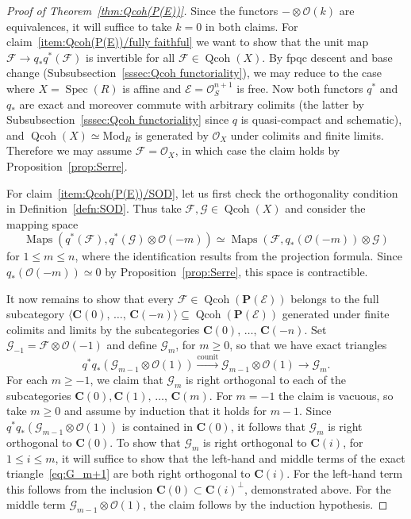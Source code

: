 \documentclass[11pt]{article}
\theoremstyle{definition}
\numberwithin{equation}{section}
\numberwithin{figure}{section}
\numberwithin{table}{section}
\newcommand{\sE}{\ensuremath{\mathcal{E}}\xspace}
\newcommand{\sF}{\ensuremath{\mathcal{F}}\xspace}
\newcommand{\sG}{\ensuremath{\mathcal{G}}\xspace}
\newcommand{\sO}{\ensuremath{\mathcal{O}}\xspace}
\newcommand{\bC}{\ensuremath{\mathbf{C}}\xspace}
\newcommand{\bP}{\ensuremath{\mathbf{P}}\xspace}
\renewcommand{\ge}{\geqslant}
\renewcommand{\le}{\leqslant}
\newcommand{\Mod}{\mrm{Mod}}
\renewcommand{\P}{\bP}
\DeclareMathOperator{\Maps}{Maps}
\DeclareMathOperator{\Spec}{Spec}
\DeclareMathOperator{\Qcoh}{Qcoh}
\newcommand{\mrm}[1]{\ensuremath{\mathrm{#1}}\xspace}
\begin{document}
\begin{proof}[Proof of Theorem~\ref{thm:Qcoh(P(E))}]
Since the functors $-\otimes\sO(k)$ are equivalences, it will suffice to take $k=0$ in both claims. For claim~\eqref{item:Qcoh(P(E))/fully faithful} we want to show that the unit map $\sF \to q_*q^*(\sF)$ is invertible for all $\sF \in \Qcoh(X)$. By fpqc descent and base change (Subsubsection~\ref{sssec:Qcoh functoriality}), we may reduce to the case where $X = \Spec(R)$ is affine and $\sE = \sO^{n+1}_S$ is free. Now both functors $q^*$ and $q_*$ are exact and moreover commute with arbitrary colimits (the latter by Subsubsection~\ref{sssec:Qcoh functoriality} since $q$ is quasi-compact and schematic), and $\Qcoh(X) \simeq \Mod_R$ is generated by $\sO_X$ under colimits and finite limits. Therefore we may assume $\sF = \sO_X$, in which case the claim holds by Proposition~\ref{prop:Serre}.

For claim~\eqref{item:Qcoh(P(E))/SOD}, let us first check the orthogonality condition in Definition~\ref{defn:SOD}. Thus take $\sF,\sG\in \Qcoh(X)$ and consider the mapping space
\[
\Maps(q^*(\sF), q^*(\sG) \otimes \sO(-m)) \simeq \Maps(\sF, q_*(\sO(-m)) \otimes \sG)
\]
for $1\le m\le n$, where the identification results from the projection formula. Since $q_*(\sO(-m)) \simeq 0$ by Proposition~\ref{prop:Serre}, this space is contractible.

It now remains to show that every $\sF \in \Qcoh(\P(\sE))$ belongs to the full subcategory $\langle \bC(0),\,\ldots,\,\bC(-n) \rangle \subseteq \Qcoh(\P(\sE))$ generated under finite colimits and limits by the subcategories $\bC(0),\,\ldots,\,\bC(-n)$. Set $\sG_{-1} = \sF \otimes \sO(-1)$ and define $\sG_m$, for $m\ge 0$, so that we have exact triangles
\begin{equation}\label{eq:G_m+1}
q^*q_*(\sG_{m-1} \otimes \sO(1)) \xrightarrow{\mrm{counit}} \sG_{m-1} \otimes \sO(1) \to \sG_{m}.
\end{equation}
For each $m\ge -1$, we claim that $\sG_m$ is right orthogonal to each of the subcategories $\bC(0),\bC(1),\,\ldots,\,\bC(m)$. For $m=-1$ the claim is vacuous, so take $m\ge 0$ and assume by induction that it holds for $m-1$. Since $q^*q_*(\sG_{m-1} \otimes \sO(1))$ is contained in $\bC(0)$, it follows that $\sG_{m}$ is right orthogonal to $\bC(0)$. To show that $\sG_m$ is right orthogonal to $\bC(i)$, for $1\le i\le m$, it will suffice to show that the left-hand and middle terms of the exact triangle~\eqref{eq:G_m+1} are both right orthogonal to $\bC(i)$. For the left-hand term this follows from the inclusion $\bC(0) \subset \bC(i)^\perp$, demonstrated above. For the middle term $\sG_{m-1} \otimes \sO(1)$, the claim follows by the induction hypothesis.


\end{proof}
\end{document}
